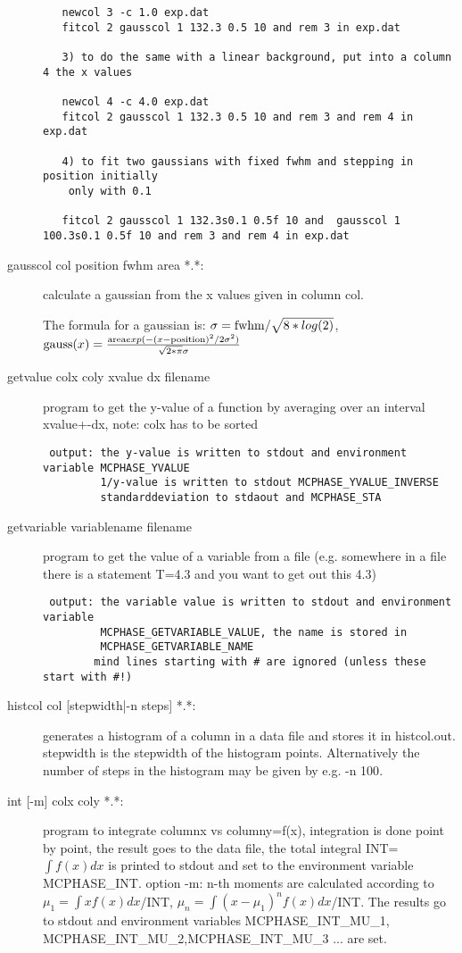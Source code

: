 \begin{description}
\begin{verbatim}
   newcol 3 -c 1.0 exp.dat
   fitcol 2 gausscol 1 132.3 0.5 10 and rem 3 in exp.dat

   3) to do the same with a linear background, put into a column 4 the x values

   newcol 4 -c 4.0 exp.dat
   fitcol 2 gausscol 1 132.3 0.5 10 and rem 3 and rem 4 in exp.dat

   4) to fit two gaussians with fixed fwhm and stepping in position initially
    only with 0.1

   fitcol 2 gausscol 1 132.3s0.1 0.5f 10 and  gausscol 1 100.3s0.1 0.5f 10 and rem 3 and rem 4 in exp.dat
\end{verbatim}

\item[\prg gausscol\index{gausscol} col position fwhm area *.*:] calculate a
gaussian from the x values given in column col.

The formula for a gaussian is:
$\sigma={\rm fwhm}/\sqrt{8*log(2)}$,
${\rm gauss}(x)=\frac{{\rm area} exp(-(x-{\rm position})^2/2 \sigma^2)}{\sqrt{2*\pi}\sigma}$

\item[\prg getvalue\index{getvalue} colx coly xvalue dx filename]
program to get the y-value of a function by averaging
 over an interval xvalue+-dx,
 note: colx has to be sorted
\begin{verbatim}
 output: the y-value is written to stdout and environment variable MCPHASE_YVALUE
         1/y-value is written to stdout MCPHASE_YVALUE_INVERSE
         standarddeviation to stdaout and MCPHASE_STA
\end{verbatim}
\item[\prg getvariable\index{getvariable} variablename filename]
 program to get the value of a variable from a file 
  (e.g. somewhere in a file there is 
   a statement T=4.3 and you want to get out this 4.3)
\begin{verbatim}
 output: the variable value is written to stdout and environment variable 
         MCPHASE_GETVARIABLE_VALUE, the name is stored in 
         MCPHASE_GETVARIABLE_NAME
        mind lines starting with # are ignored (unless these start with #!)
\end{verbatim}
\item[\prg histcol\index{histcol} col {[stepwidth|-n steps]} *.*:] generates a histogram of
a column in a data file and stores it in histcol.out. stepwidth is the 
stepwidth of the histogram points. Alternatively the number of
steps in the histogram may be given by e.g. {\prg -n 100}.
\item[\prg int\index{int} {[-m] }colx coly *.*:]
 program  to integrate columnx vs columny=f(x), integration is done 
point by point, the result goes to the data file, the total integral 
INT=$\int f(x)dx$ is printed to stdout and set to the 
 environment variable MCPHASE\_INT.
 option -m: n-th moments are calculated according to $\mu_1=\int x f(x)dx$/INT, $\mu_n=\int (x-\mu_1)^n f(x)dx$/INT.
The results go to stdout and environment variables MCPHASE\_INT\_MU\_1,
  MCPHASE\_INT\_MU\_2,MCPHASE\_INT\_MU\_3 ... are set.


\end{description}
